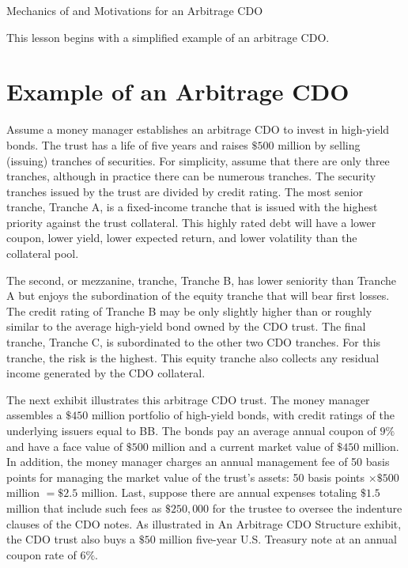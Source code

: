 \documentclass[11pt]{article}
\begin{document}
Mechanics of and Motivations for an Arbitrage CDO

This lesson begins with a simplified example of an arbitrage CDO.

\section*{Example of an Arbitrage CDO}
Assume a money manager establishes an arbitrage CDO to invest in high-yield bonds. The trust has a life of five years and raises $\$ 500$ million by selling (issuing) tranches of securities. For simplicity, assume that there are only three tranches, although in practice there can be numerous tranches. The security tranches issued by the trust are divided by credit rating. The most senior tranche, Tranche A, is a fixed-income tranche that is issued with the highest priority against the trust collateral. This highly rated debt will have a lower coupon, lower yield, lower expected return, and lower volatility than the collateral pool.

The second, or mezzanine, tranche, Tranche B, has lower seniority than Tranche A but enjoys the subordination of the equity tranche that will bear first losses. The credit rating of Tranche B may be only slightly higher than or roughly similar to the average high-yield bond owned by the CDO trust. The final tranche, Tranche C, is subordinated to the other two CDO tranches. For this tranche, the risk is the highest. This equity tranche also collects any residual income generated by the CDO collateral.

The next exhibit illustrates this arbitrage CDO trust. The money manager assembles a $\$ 450$ million portfolio of high-yield bonds, with credit ratings of the underlying issuers equal to BB. The bonds pay an average annual coupon of $9 \%$ and have a face value of $\$ 500$ million and a current market value of $\$ 450$ million. In addition, the money manager charges an annual management fee of 50 basis points for managing the market value of the trust's assets: 50 basis points $\times \$ 500$ million $=\$ 2.5$ million. Last, suppose there are annual expenses totaling $\$ 1.5$ million that include such fees as $\$ 250,000$ for the trustee to oversee the indenture clauses of the CDO notes. As illustrated in An Arbitrage CDO Structure exhibit, the CDO trust also buys a $\$ 50$ million five-year U.S. Treasury note at an annual coupon rate of $6 \%$.
\end{document}
